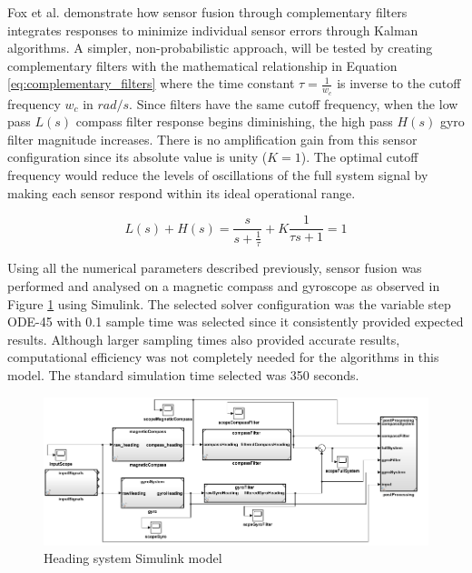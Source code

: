 
Fox et al. \cite{foxlin1996inertial} demonstrate how sensor fusion through complementary filters integrates responses to minimize individual sensor errors through Kalman algorithms. A simpler, non-probabilistic approach, will be tested by creating complementary filters with the mathematical relationship in Equation \ref{eq:complementary_filters} where the time constant $\tau = \frac{1}{w_{c}}$ is inverse to the cutoff frequency $w_{c}$ in $rad/s$. Since filters have the same cutoff frequency, when the low pass $L(s)$ compass filter response begins diminishing, the high pass $H(s)$ gyro filter magnitude increases. There is no amplification gain from this sensor configuration since its absolute value is unity ($K=1$). The optimal cutoff frequency would reduce the levels of oscillations of the full system signal by making each sensor respond within its ideal operational range. 

\begin{equation}
    L(s) + H(s) =
    \frac{s}{s + \frac{1}{\tau}} +  K{\frac  {1}{\tau s+1}} = 1
    \label{eq:complementary_filters}
\end{equation}



Using all the numerical parameters described previously, sensor fusion was performed and analysed on a magnetic compass and gyroscope as observed in Figure \ref{fig:simulink_model} using Simulink. The selected solver configuration was the variable step ODE-45 with 0.1 sample time was selected since it consistently provided expected results. Although larger sampling times also provided accurate results, computational efficiency was not completely needed for the algorithms in this model. The standard simulation time selected was 350 seconds.

\begin{figure}[h]
    \centering
    \includegraphics[width=\textwidth]{img/simulink_model.PNG}
    \caption{Heading system Simulink model}
    \label{fig:simulink_model}
\end{figure}

